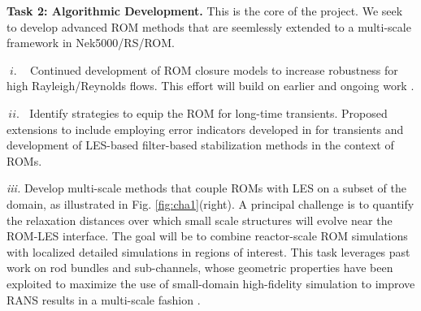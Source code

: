 

\noindent
\textbf{Task 2: Algorithmic Development.} This is the core of the project.
We seek to develop advanced ROM methods that are seemlessly
extended to a multi-scale framework in Nek5000/RS/ROM.
\\[-4ex]
\begin{description}
\item{$\; i. \; \; \;$}
Continued development of ROM closure models to increase robustness 
for high Rayleigh/Reynolds flows.  This effort will build on earlier and 
ongoing work
\cite{kaneko22a,kaneko22,tsai22a,kaneko20a,mou2021}.
\\[-3ex]
\item{$\, ii. \;\;$}
Identify strategies to equip the ROM for long-time transients.  
Proposed extensions to \cite{kaneko20a} include employing error indicators
developed in \cite{fick18,tsai22a} for transients and development of 
LES-based filter-based stabilization methods in the context of ROMs.
\\[-3ex]
\item{\em iii. \;}Develop multi-scale methods that couple ROMs with LES on a 
subset of the domain, as illustrated in Fig. \ref{fig:cha1}(right).
A principal challenge is to quantify the relaxation distances over which small
scale structures will evolve near the ROM-LES interface. The goal will be to
combine reactor-scale ROM simulations with localized detailed simulations in
regions of interest. This task leverages past work on rod bundles and sub-channels,
whose geometric properties have been exploited to maximize the use of 
small-domain high-fidelity simulation to improve RANS results in a multi-scale
fashion \cite{martinez2019a}.  
\\[-3ex]
\end{description}%

